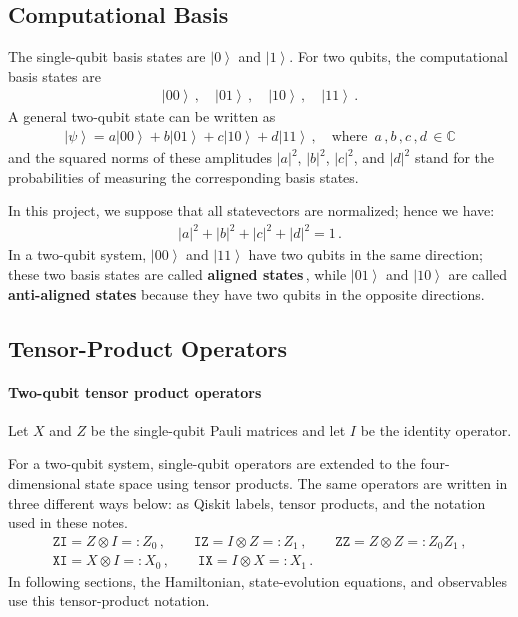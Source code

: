 \documentclass[11pt]{article}
\numberwithin{equation}{section}
\newcommand{\nm}[1]{\left| #1 \right|^2} %
\newcommand{\ket}[1]{\left| #1 \right\rangle} %
\begin{document}
\subsection{Computational Basis}
The single-qubit basis states are $\ket{0}$ and $\ket{1}$. For two qubits, the computational basis states are
\begin{align*}
  \ket{00} \,,\quad \ket{01} \,,\quad \ket{10} \,,\quad \ket{11} \,.
\end{align*}
A general two-qubit state can be written as
\begin{align*}
    \ket{\psi} = a\ket{00} + b\ket{01} + c\ket{10} + d\ket{11} \,, \quad
    \text{where }\, a \,, b \,, c \,, d \,\in \mathbb{C}
\end{align*}
and the squared norms of these amplitudes $\nm{a}$, $\nm{b}$, $\nm{c}$, and $\nm{d}$ stand for the probabilities of measuring the corresponding basis states.

In this project, we suppose that all statevectors are normalized; hence we have:
\begin{align*}
    \nm{a} + \nm{b} + \nm{c} + \nm{d} = 1 \,.
\end{align*}
In a two-qubit system, $\ket{00}$ and $\ket{11}$ have two qubits in the same direction; these two basis states are called \textbf{aligned states}\,, while $\ket{01}$ and $\ket{10}$ are called \textbf{anti-aligned states} because they have two qubits in the opposite directions.

\subsection{Tensor-Product Operators}
\paragraph{Two-qubit tensor product operators}
Let $X$ and $Z$ be the single-qubit Pauli matrices and let $I$ be the identity operator.

For a two-qubit system, single-qubit operators are extended to the four-dimensional state space using tensor products. The same operators are written in three different ways below: as Qiskit labels, tensor products, and the notation used in these notes.
\begin{gather}
  \texttt{ZI} = Z \otimes I =: Z_0\,,\qquad
  \texttt{IZ} = I \otimes Z =: Z_1\,,\qquad
  \texttt{ZZ} = Z \otimes Z =: Z_0Z_1\,, \label{Z_tnsr_prd}\\
  \texttt{XI} = X \otimes I =: X_0\,,\qquad
  \texttt{IX} = I \otimes X =: X_1\,. \label{X_tnsr_prd}
\end{gather}
In following sections, the Hamiltonian, state-evolution equations, and observables use this tensor-product notation.
\end{document}

